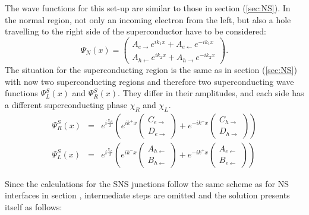 The wave functions for this set-up are similar to those in section (\ref{sec:NS}). In the normal region, not only an incoming electron from the left, but also a hole travelling to the right side of the superconductor have to be considered:
\begin{equation}
\Psi_N\left(x\right) = \begin{pmatrix}
A_{e\rightarrow} e^{i k_1 x} + A_{e\leftarrow} e^{- i k_1 x} \\
A_{h\leftarrow}e^{i k_2 x}  + A_{h\rightarrow} e^{-i k_2 x} 
\end{pmatrix}.
\end{equation}
The situation for the superconducting region is the same as in section (\ref{sec:NS}) with now two superconducting regions and therefore two superconducting wave functions $\Psi^S_L \left( x \right)$ and $\Psi^S_R \left( x \right)$. They differ in their amplitudes, and each side has a different superconducting phase $\chi_R$ and $\chi_L$.
\begin{eqnarray}
\Psi^S_R \left( x \right) &=& e^{i \frac{\chi_R}{2}} \left(  e^{i k^+ x } \begin{pmatrix} C_{e\rightarrow} \\ D_{e\rightarrow} \end{pmatrix} + e^{- i k^- x } \begin{pmatrix} C_{h\rightarrow} \\ D_{h\rightarrow} \end{pmatrix} \right) \\
\Psi^S_L \left( x \right) &=& e^{i \frac{\chi_L}{2}} \left(  e^{i k^- x } \begin{pmatrix} A_{h\leftarrow} \\ B_{h\leftarrow}\end{pmatrix} + e^{- i k^+ x } \begin{pmatrix} A_{e \leftarrow}\\ B_{e \leftarrow}\end{pmatrix} \right) 
\end{eqnarray}

Since the calculations for the SNS junctions follow the same scheme as for NS interfaces in section 
, intermediate steps are omitted and the solution presents itself as follows:






